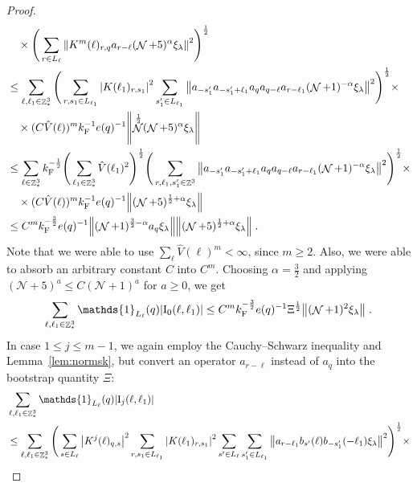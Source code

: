 \documentclass[12pt,a4paper]{article}
\numberwithin{equation}{section}
\newcommand{\cN}{\mathcal{N}}
\newcommand{\1}{\mathbb{I}}
\newcommand{\F}{\mathrm{F}}
\newcommand{\I}{\mathrm{I}}
\DeclareMathOperator{\Z}{\mathbb{Z}}
\DeclareMathOperator{\NN}{\mathcal{N}}
\newcommand{\half}{\frac{1}{2}}
\theoremstyle{plain}
\theoremstyle{definition}
\theoremstyle{remark}
\theoremstyle{plain}
\theoremstyle{definition}
\theoremstyle{remark}
\begin{document}
\begin{proof}
{\begin{align}
	&\quad \times \Bigg( \sum\limits_{r \in L_\ell} \norm{  K^{m}(\ell)_{r,q} a_{r-\ell} (\NN+5)^{\alpha}\xi_\lambda }^2\Bigg)^\half \nonumber\\
	&\leq \sum_{\ell,\ell_1 \in \Z^3_*} \Bigg( \sum\limits_{r,s_1 \in L_{\ell_1}}\abs{K(\ell_1)_{r,s_1}}^2 \sum\limits_{s_1' \in L_{\ell_1}} \norm{ a_{-s_1'} a_{-s_1' + \ell_1} a_q a_{q-\ell} a_{r-\ell_1} (\NN+1)^{-\alpha}\xi_\lambda}^2\Bigg)^\half \times\nonumber\\
	& \quad \times (C \hat{V}(\ell))^m k_{\F}^{-1} e(q)^{-1} \norm{ \NN^\half(\NN+5)^{\alpha}\xi_\lambda } \nonumber\\
	&\leq \sum_{\ell \in \Z^3_*} k_{\F}^{-\half} \Bigg( \sum_{\ell_1 \in \Z^3_*} \hat{V}(\ell_1)^2 \Bigg)^{\half}
		\Bigg( \sum_{r,\ell_1,s_1' \in \Z^3}
		\norm{ a_{-s_1'} a_{-s_1'+\ell_1} a_q a_{q-\ell} a_{r-\ell_1} (\NN+1)^{-\alpha}\xi_\lambda}^2\Bigg)^\half \times\nonumber\\
	& \quad \times (C \hat{V}(\ell))^m k_{\F}^{-1} e(q)^{-1} \norm{ (\NN+5)^{\half + \alpha}\xi_\lambda } \nonumber\\
	&\leq C^m k_{\F}^{-\frac 32} e(q)^{-1}
		\norm{ (\NN+1)^{\frac 32-\alpha} a_q \xi_\lambda} \norm{ (\NN+5)^{\half+\alpha}\xi_\lambda } \nonumber \;.\\
\end{align}
Note that we were able to use $ \sum_\ell \hat{V}(\ell)^m < \infty $, since $ m \ge 2 $. Also, we were able to absorb an arbitrary constant $ C $ into $ C^m $. Choosing $\alpha = \frac 32$ and applying $ (\cN+5)^a \le C (\cN+1)^a $ for $ a \ge 0 $, we get
\begin{equation}
	 \sum_{\ell,\ell_1 \in \Z^3_*} \mathds{1}_{L_\ell}(q) |\I_0(\ell, \ell_1)|
	 \leq C^m k_{\F}^{-\frac 32} e(q)^{-1} \Xi^\half
	 	\norm { (\NN+1)^2 \xi_\lambda } \;. \label{eq:estEQ1111} 
\end{equation}
}
In case $ 1 \le j \le m-1 $, we again employ the Cauchy--Schwarz inequality and Lemma~\ref{lem:normsk}, but convert an operator $ a_{r-\ell} $ instead of $ a_q $ into the bootstrap quantity $ \Xi $:
\textcolor{green!30!black}{
\begin{align}
	&\sum_{\ell,\ell_1 \in \Z^3_*} \mathds{1}_{L_\ell}(q) |\I_j(\ell, \ell_1)| \nonumber\\
	&\leq \sum_{\ell,\ell_1 \in \Z^3_*} \Bigg( \sum\limits_{s \in L_\ell} \abs{K^j(\ell)_{q,s}}^2
		\sum\limits_{r, s_1 \in L_{\ell_1}} \abs{K(\ell_1)_{r,s_1}}^2
		\sum\limits_{s' \in L_\ell} \sum\limits_{s_1' \in L_{\ell_1}} \norm{a_{r-\ell_1} b_{s'}(\ell) b_{-s_1'}(-\ell_1) \xi_\lambda}^2 \Bigg)^\half \times \nonumber\\

\end{align}}
\end{proof}
\end{document}
